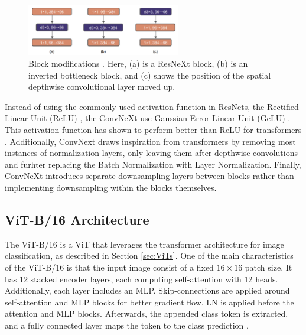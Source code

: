 \begin{figure}[h!]
    \centering
    \includegraphics[width=0.6\textwidth]{Images/convnext_block_mod.png} 
    \caption{Block modifications \cite{liu2022convnet2020s}. Here, (a) is a ResNeXt block, (b) is an inverted bottleneck block, and (c) shows the position of the spatial depthwise convolutional layer moved up.}
    \label{fig:conv_block}
\end{figure}

Instead of using the commonly used activation function in ResNets, the Rectified Linear Unit (ReLU) \cite{relu}, the ConvNeXt use Gaussian Error Linear Unit (GeLU) \cite{hendrycks2023gaussianerrorlinearunits}. This activation function has shown to perform better than ReLU for transformers \cite{liu2022convnet2020s}. Additionally, ConvNext draws inspiration from transformers by removing most instances of normalization layers, only leaving them after depthwise convolutions and furhter replacing the Batch Normalization with Layer Normalization. Finally, ConvNeXt introduces separate downsampling layers between blocks rather than implementing downsampling within the blocks themselves. 


\subsection{ViT-B/16 Architecture}
\label{sec:vitb16}
The ViT-B/16 \cite{dosovitskiy2021imageworth16x16words} is a ViT that leverages the transformer architecture for image classification, as described in Section \ref{sec:ViTs}. One of the main characteristics of the ViT-B/16 is that the input image consist of a fixed $16 \times 16$ patch size. It has 12 stacked encoder layers, each computing self-attention with 12 heads. Additionally, each layer includes an MLP. Skip-connections are applied around self-attention and MLP blocks for better gradient flow. LN is applied before the attention and MLP blocks. Afterwards, the appended class token is extracted, and a fully connected layer maps the token to the class prediction \cite{torchvision2024vitb16}. 


